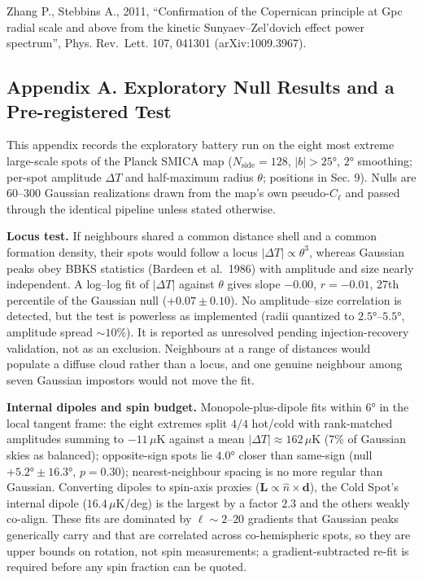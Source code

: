 \documentclass[
]{article}
\begin{document}
Zhang P., Stebbins A., 2011, ``Confirmation of the Copernican principle
at Gpc radial scale and above from the kinetic Sunyaev--Zel'dovich
effect power spectrum'', Phys. Rev.~Lett. 107, 041301 (arXiv:1009.3967).

\hypertarget{appendix-a.-exploratory-null-results-and-a-pre-registered-test}{%
\subsection{\texorpdfstring{\textbf{Appendix A. Exploratory Null Results
and a Pre-registered
Test}}{Appendix A. Exploratory Null Results and a Pre-registered Test}}\label{appendix-a.-exploratory-null-results-and-a-pre-registered-test}}

This appendix records the exploratory battery run on the eight most
extreme large-scale spots of the Planck SMICA map
(\(N_{\text{side}} = 128\), \(|b| > 25°\), \(2°\) smoothing; per-spot
amplitude \(\Delta T\) and half-maximum radius \(\theta\); positions in
Sec. 9). Nulls are 60--300 Gaussian realizations drawn from the map's
own pseudo-\(C_\ell\) and passed through the identical pipeline unless
stated otherwise.

\textbf{Locus test.} If neighbours shared a common distance shell and a
common formation density, their spots would follow a locus
\(|\Delta T| \propto \theta^3\), whereas Gaussian peaks obey BBKS
statistics (Bardeen et al.~1986) with amplitude and size nearly
independent. A log--log fit of \(|\Delta T|\) against \(\theta\) gives
slope \(-0.00\), \(r = -0.01\), 27th percentile of the Gaussian null
(\(+0.07 \pm 0.10\)). No amplitude--size correlation is detected, but
the test is powerless as implemented (radii quantized to
\(2.5°\)--\(5.5°\), amplitude spread \(\sim\!10\%\)). It is reported as
unresolved pending injection-recovery validation, not as an exclusion.
Neighbours at a range of distances would populate a diffuse cloud rather
than a locus, and one genuine neighbour among seven Gaussian impostors
would not move the fit.

\textbf{Internal dipoles and spin budget.} Monopole-plus-dipole fits
within \(6°\) in the local tangent frame: the eight extremes split
\(4/4\) hot/cold with rank-matched amplitudes summing to \(-11\,\mu\)K
against a mean \(|\Delta T| \approx 162\,\mu\)K (7\% of Gaussian skies
as balanced); opposite-sign spots lie \(4.0°\) closer than same-sign
(null \(+5.2° \pm 16.3°\), \(p = 0.30\)); nearest-neighbour spacing is
no more regular than Gaussian. Converting dipoles to spin-axis proxies
(\(\mathbf{L} \propto \hat{n} \times \mathbf{d}\)), the Cold Spot's
internal dipole (\(16.4\,\mu\)K/deg) is the largest by a factor \(2.3\)
and the others weakly co-align. These fits are dominated by
\(\ell \sim 2\)--\(20\) gradients that Gaussian peaks generically carry
and that are correlated across co-hemispheric spots, so they are upper
bounds on rotation, not spin measurements; a gradient-subtracted re-fit
is required before any spin fraction can be quoted.
\end{document}
